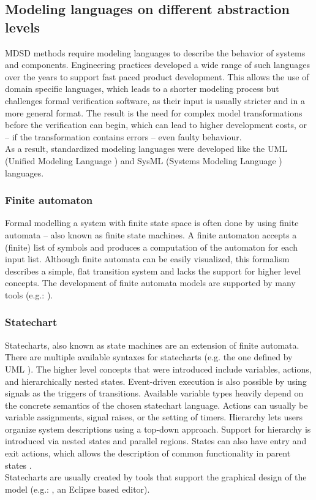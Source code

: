 \subsection{Modeling languages on different abstraction levels}

MDSD methods require modeling languages to describe the behavior of systems and components. Engineering practices developed a wide range of such languages over the years to support fast paced product development. This allows the use of domain specific languages, which leads to a shorter modeling process but challenges formal verification software, as their input is usually stricter and in a more general format. The result is the need for complex model transformations before the verification can begin, which can lead to higher development costs, or -- if the transformation contains errors -- even faulty behaviour.\\
As a result, standardized modeling languages were developed like the UML (Unified Modeling Language \citep{uml}) and SysML (Systems Modeling Language \citep{sysml}) languages.

\subsubsection{Finite automaton}

Formal modelling a system with finite state space is often done by using finite automata -- also known as finite state machines. A finite automaton accepts a (finite) list of symbols and produces a computation of the automaton for each input list.
Although finite automata can be easily visualized, this formalism describes a simple, flat transition system and lacks the support for higher level concepts. The development of finite automata models  are supported by many tools (e.g.: \citep{fsmd}).

\subsubsection{Statechart}

Statecharts, also known as state machines are an extension of finite automata. There are multiple available syntaxes for statecharts (e.g. the one defined by UML \citep{stcuml}). The higher level concepts that were introduced include variables, actions, and hierarchically nested states. Event-driven execution is also possible by using signals as the triggers of transitions. Available variable types heavily depend on the concrete semantics of the chosen statechart language. Actions can usually be variable assignments, signal raises, or the setting of timers. Hierarchy lets users organize system descriptions using a top-down approach. Support for hierarchy is introduced via nested states and parallel regions. States can also have entry and exit actions, which allows the description of common functionality in parent states \citep{stcmove}.\\
Statecharts are usually created by tools that support the graphical design of the model (e.g.: \citep{yakinduu}, an Eclipse based editor).


